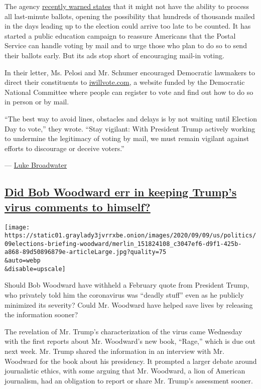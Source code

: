 The agency
\href{https://www.nytimes3xbfgragh.onion/2020/08/14/us/politics/usps-vote-mail.html}{recently
warned states} that it might not have the ability to process all
last-minute ballots, opening the possibility that hundreds of thousands
mailed in the days leading up to the election could arrive too late to
be counted. It has started a public education campaign to reassure
Americans that the Postal Service can handle voting by mail and to urge
those who plan to do so to send their ballots early. But its ads stop
short of encouraging mail-in voting.

In their letter, Ms. Pelosi and Mr. Schumer encouraged Democratic
lawmakers to direct their constituents to
\href{http://iwillvote.com/}{iwillvote.com}, a website funded by the
Democratic National Committee where people can register to vote and find
out how to do so in person or by mail.

``The best way to avoid lines, obstacles and delays is by not waiting
until Election Day to vote,'' they wrote. ``Stay vigilant: With
President Trump actively working to undermine the legitimacy of voting
by mail, we must remain vigilant against efforts to discourage or
deceive voters.''

--- \href{https://www.nytimes3xbfgragh.onion/by/luke-broadwater}{Luke
Broadwater}

\hypertarget{did-bob-woodward-err-in-keeping-trumps-virus-comments-to-himself}{%
\subsection{\texorpdfstring{\protect\hyperlink{did-bob-woodward-err-in-keeping-trumps-virus-comments-to-himself}{Did
Bob Woodward err in keeping Trump's virus comments to
himself?}}{Did Bob Woodward err in keeping Trump's virus comments to himself?}}\label{did-bob-woodward-err-in-keeping-trumps-virus-comments-to-himself}}

\texttt{[image: https://static01.graylady3jvrrxbe.onion/images/2020/09/09/us/politics/09elections-briefing-woodward/merlin\_151824108\_c3047ef6-d9f1-425b-a868-89d50896879e-articleLarge.jpg?quality=75\\\&auto=webp\\\&disable=upscale]}

Should Bob Woodward have withheld a February quote from President Trump,
who privately told him the coronavirus was ``deadly stuff'' even as he
publicly minimized its severity? Could Mr. Woodward have helped save
lives by releasing the information sooner?

The revelation of Mr. Trump's characterization of the virus came
Wednesday with the first reports about Mr. Woodward's new book,
``Rage,'' which is due out next week. Mr. Trump shared the information
in an interview with Mr. Woodward for the book about his presidency. It
prompted a larger debate around journalistic ethics, with some arguing
that Mr. Woodward, a lion of American journalism, had an obligation to
report or share Mr. Trump's assessment sooner.

